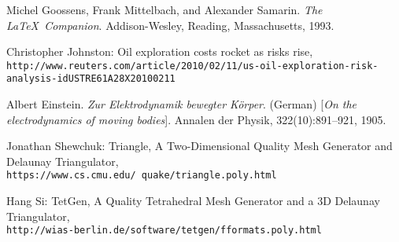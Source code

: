 
\newpage

\begin{thebibliography}{9}

Michel Goossens, Frank Mittelbach, and Alexander Samarin. 
\textit{The \LaTeX\ Companion}. 
Addison-Wesley, Reading, Massachusetts, 1993.

Christopher Johnston: Oil exploration costs rocket as risks rise,
\\\texttt{http://www.reuters.com/article/2010/02/11/us-oil-exploration-risk-analysis-idUSTRE61A28X20100211}

Albert Einstein. 
\textit{Zur Elektrodynamik bewegter K{\"o}rper}. (German) [\textit{On the electrodynamics of moving bodies}]. 
Annalen der Physik, 322(10):891–921, 1905.

Jonathan Shewchuk: Triangle, A Two-Dimensional Quality Mesh Generator and Delaunay Triangulator,
\\\texttt{https://www.cs.cmu.edu/~quake/triangle.poly.html}

Hang Si: TetGen, A Quality Tetrahedral Mesh Generator and a 3D Delaunay Triangulator,
\\\texttt{http://wias-berlin.de/software/tetgen/fformats.poly.html}

\end{thebibliography}
